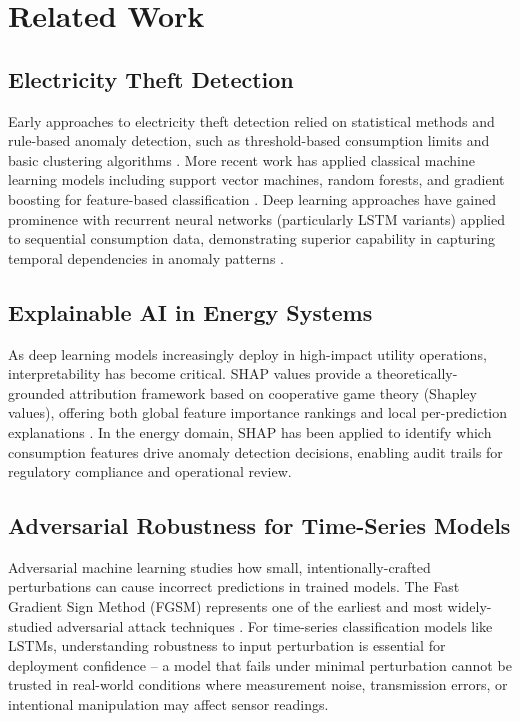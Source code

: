 \documentclass[journal]{IEEEtran}
\begin{document}
\section{Related Work}
\subsection{Electricity Theft Detection}
Early approaches to electricity theft detection relied on statistical methods and rule-based anomaly detection, such as threshold-based consumption limits and basic clustering algorithms \cite{jokar2016}. More recent work has applied classical machine learning models including support vector machines, random forests, and gradient boosting for feature-based classification \cite{asghar2017}. Deep learning approaches have gained prominence with recurrent neural networks (particularly LSTM variants) applied to sequential consumption data, demonstrating superior capability in capturing temporal dependencies in anomaly patterns \cite{zhang2021}.

\subsection{Explainable AI in Energy Systems}
As deep learning models increasingly deploy in high-impact utility operations, interpretability has become critical. SHAP values provide a theoretically-grounded attribution framework based on cooperative game theory (Shapley values), offering both global feature importance rankings and local per-prediction explanations \cite{lundberg2017}. In the energy domain, SHAP has been applied to identify which consumption features drive anomaly detection decisions, enabling audit trails for regulatory compliance and operational review.

\subsection{Adversarial Robustness for Time-Series Models}
Adversarial machine learning studies how small, intentionally-crafted perturbations can cause incorrect predictions in trained models. The Fast Gradient Sign Method (FGSM) represents one of the earliest and most widely-studied adversarial attack techniques \cite{goodfellow2015}. For time-series classification models like LSTMs, understanding robustness to input perturbation is essential for deployment confidence -- a model that fails under minimal perturbation cannot be trusted in real-world conditions where measurement noise, transmission errors, or intentional manipulation may affect sensor readings.
\end{document}

